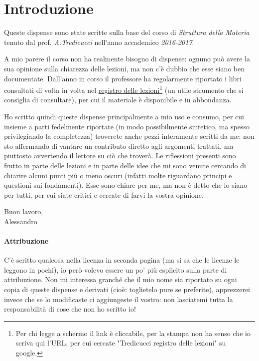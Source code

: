 
\chapter*{Introduzione}

Queste dispense sono state scritte sulla base del corso di \textit{Struttura della Materia} tenuto dal prof. \textit{A.Tredicucci} nell'anno accademico \textit{2016-2017}.
\newline

A mio parere il corso non ha realmente bisogno di dispense: ognuno può avere la sua opinione sulla chiarezza delle lezioni, ma non c'è dubbio che esse siano ben documentate. Dall'anno in corso il professore ha regolarmente riportato i libri consultati di volta in volta nel \href{http://unimap.unipi.it/registri/dettregistriNEW.php?re=181626::::&ri=12126}{registro delle lezioni}\footnote{Per chi legge a schermo il link è cliccabile, per la stampa non ha senso che io scriva qui l'URL, per cui cercate "Tredicucci registro delle lezioni" su google.} (un utile strumento che si consiglia di consultare), per cui il materiale è disponibile e in abbondanza.
\newline

Ho scritto quindi queste dispense principalmente a mio uso e consumo, per cui insieme a parti fedelmente riportate (in modo possibilmente sintetico, ma spesso privilegiando la completezza) troverete anche pezzi interamente scritti da me: non sto affermando di vantare un contributo diretto agli argomenti trattati, ma piuttosto avvertendo il lettore su ciò che troverà. Le riflessioni presenti sono frutto in parte delle lezioni e in parte delle idee che mi sono venute cercando di chiarire alcuni punti più o meno oscuri (infatti molte riguardano principi e questioni sui fondamenti). Esse sono chiare per me, ma non è detto che lo siano per tutti, per cui siate critici e cercate di farvi la vostra opinione.

\begin{flushright}
	Buon lavoro,\\
	Alessandro
\end{flushright}

\subsubsection*{Attribuzione}
C'è scritto qualcosa nella licenza in seconda pagina (ma si sa che le licenze le leggono in pochi), io però volevo essere un po' più esplicito sulla parte di attribuzione. Non mi interessa granché che il mio nome sia riportato su ogni copia di queste dispense e derivati (cioè: toglietelo pure se preferite), apprezzerei invece che se lo modificaste ci aggiungeste il vostro: non lasciatemi tutta la responsabilità di cose che non ho scritto io!
